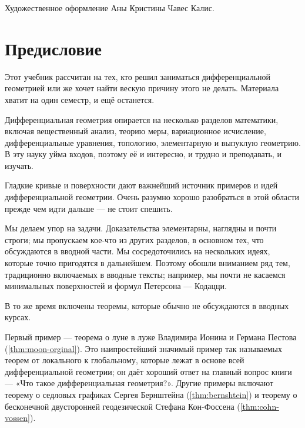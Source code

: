 Художественное оформление Аны Кристины Чавес Калис.
\null
\vfill
{}


\thispagestyle{empty}
\newpage

\chapter*{Предисловие}
\thispagestyle{myheadings}

Этот учебник рассчитан на тех, кто решил заниматься дифференциальной геометрией или же хочет найти вескую причину этого не делать.
Материала хватит на один семестр, и ещё останется.

Дифференциальная геометрия опирается на несколько разделов математики, включая
вещественный анализ,
теорию меры,
вариационное исчисление,
дифференциальные уравнения, топологию, элементарную и выпуклую геометрию.
В эту науку уйма входов, поэтому её и интересно, и трудно и преподавать, и изучать.

Гладкие кривые и поверхности дают важнейший источник примеров и идей дифференциальной геометрии.
Очень разумно хорошо разобраться в этой области прежде чем идти дальше --- не стоит спешить.

Мы делаем упор на задачи.
Доказательства элементарны, наглядны и почти строги;
мы пропускаем кое-что из других разделов, в основном тех, что обсуждаются в вводной части.
Мы сосредоточились на нескольких идеях, которые точно пригодятся в дальнейшем.
Поэтому обошли вниманием ряд тем, традиционно включаемых в вводные тексты;
например, мы почти не касаемся минимальных поверхностей и формул Петерсона --- Кодацци.

В то же время включены теоремы, которые обычно не обсуждаются в вводных курсах.

Первый пример --- теорема о луне в луже Владимира Ионина и Германа Пестова (\ref{thm:moon-orginal}).
Это наипростейший значимый пример так называемых теорем от локального к глобальному, которые лежат в основе всей дифференциальной геометрии;
он даёт хороший ответ на главный вопрос книги --- «Что такое дифференциальная геометрия?».
Другие примеры включают теорему о седловых графиках Сергея Бернштейна (\ref{thm:bernshtein}) и теорему о бесконечной двусторонней геодезической Стефана Кон-Фоссена (\ref{thm:cohn-vossen}).

